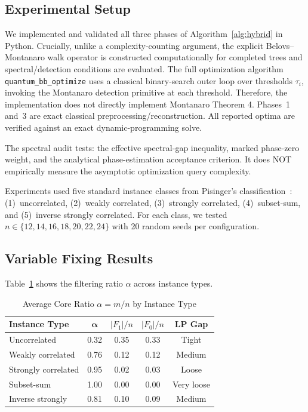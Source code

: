 \documentclass[conference]{IEEEtran} \IEEEoverridecommandlockouts
\begin{document}
\subsection{Experimental Setup}
We implemented and validated all three phases of Algorithm~\ref{alg:hybrid} in Python. Crucially, unlike a complexity-counting argument, the explicit Belovs--Montanaro walk operator is constructed computationally for completed trees and spectral/detection conditions are evaluated. The full optimization algorithm \texttt{quantum\_bb\_optimize} uses a classical binary-search outer loop over thresholds $\tau_i$, invoking the Montanaro detection primitive at each threshold. Therefore, the implementation does not directly implement Montanaro Theorem 4. Phases~1 and~3 are exact classical preprocessing/reconstruction. All reported optima are verified against an exact dynamic-programming solve.

The spectral audit tests: the effective spectral-gap inequality, marked phase-zero weight, and the analytical phase-estimation acceptance criterion. It does NOT empirically measure the asymptotic optimization query complexity.

Experiments used five standard instance classes from Pisinger's classification~\cite{ref3}: (1)~uncorrelated, (2)~weakly correlated, (3)~strongly correlated, (4)~subset-sum, and (5)~inverse strongly correlated. For each class, we tested $n \in \{12, 14, 16, 18, 20, 22, 24\}$ with 20 random seeds per configuration.

\subsection{Variable Fixing Results}
Table~\ref{tab:fixing} shows the filtering ratio $\alpha$ across instance types.

\begin{table}[htbp] \caption{Average Core Ratio $\alpha = m/n$ by Instance Type} \label{tab:fixing} \begin{center} \begin{tabular}{lcccc} \toprule \textbf{Instance Type} & $\boldsymbol{\alpha}$ & $|F_1|/n$ & $|F_0|/n$ & \textbf{LP Gap} \\ \midrule Uncorrelated & 0.32 & 0.35 & 0.33 & Tight \\ Weakly correlated & 0.76 & 0.12 & 0.12 & Medium \\ Strongly correlated & 0.95 & 0.02 & 0.03 & Loose \\ Subset-sum & 1.00 & 0.00 & 0.00 & Very loose \\ Inverse strongly & 0.81 & 0.10 & 0.09 & Medium \\ \bottomrule \end{tabular} \end{center} \end{table}
\end{document}
